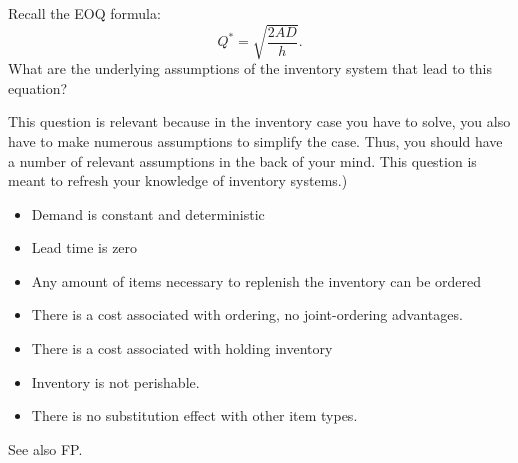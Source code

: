 \begin{question}\label{ex:1}
  Recall the EOQ formula:
  \begin{equation*}
    Q^* = \sqrt{\frac{ 2 A D}{h}}.
  \end{equation*}
What are the underlying assumptions of the inventory system that lead to this equation?

This question is relevant because in the inventory case you have to
solve, you also have to make numerous assumptions to simplify the
case. Thus, you should have a number of relevant assumptions in the
back of your mind.  This question is meant to refresh your knowledge
of inventory systems.)
\begin{solution}
\begin{itemize}
\item Demand is constant and deterministic
\item Lead time is zero
\item Any amount of items necessary to replenish the inventory can be
  ordered
\item There is a cost associated with ordering, no joint-ordering advantages.
\item There is a cost associated with holding inventory
\item Inventory is not perishable.
\item There is no substitution effect with other item types.
\end{itemize}
See also FP.
\end{solution}
\end{question}


